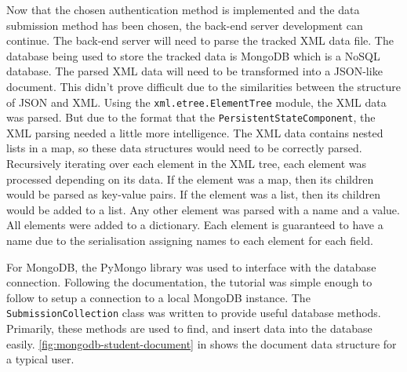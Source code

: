 Now that the chosen authentication method is implemented and the data submission method has been chosen, the back-end server development can continue. The back-end server will need to parse the tracked XML data file. The database being used to store the tracked data is MongoDB which is a NoSQL database. The parsed XML data will need to be transformed into a JSON-like document. This didn't prove difficult due to the similarities between the structure of JSON and XML. Using the \texttt{xml.etree.ElementTree} module, the XML data was parsed. But due to the format that the \texttt{PersistentStateComponent}, the XML parsing needed a little more intelligence. The XML data contains nested lists in a map, so these data structures would need to be correctly parsed. Recursively iterating over each element in the XML tree, each element was processed depending on its data. If the element was a map, then its children would be parsed as key-value pairs. If the element was a list, then its children would be added to a list. Any other element was parsed with a name and a value. All elements were added to a dictionary. Each element is guaranteed to have a name due to the serialisation assigning names to each element for each field.

For MongoDB, the PyMongo library was used to interface with the database connection\cite{PyMongoDocs}. Following the documentation, the tutorial was simple enough to follow to setup a connection to a local MongoDB instance. The \texttt{SubmissionCollection} class was written to provide useful database methods. Primarily, these methods are used to find, and insert data into the database easily. \autoref{fig:mongodb-student-document} in  shows the document data structure for a typical user.

